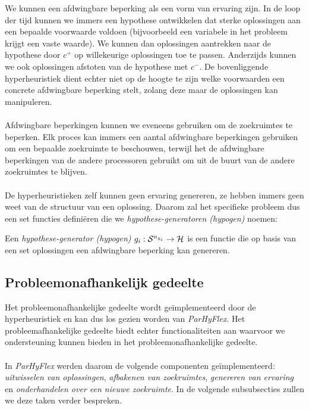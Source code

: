 We kunnen een afdwingbare beperking als een vorm van ervaring zijn. In de loop der tijd kunnen we immers een hypothese ontwikkelen dat sterke oplossingen aan een bepaalde voorwaarde voldoen (bijvoorbeeld een variabele in het probleem krijgt een vaste waarde). We kunnen dan oplossingen aantrekken naar de hypothese door $c^+$ op willekeurige oplossingen toe te passen. Anderzijds kunnen we ook oplossingen afstoten van de hypothese met $c^-$. De bovenliggende hyperheuristiek dient echter niet op de hoogte te zijn welke voorwaarden een concrete afdwingbare beperking stelt, zolang deze maar de oplossingen kan manipuleren.

\paragraph{}
Afdwingbare beperkingen kunnen we eveneens gebruiken om de zoekruimtes te beperken. Elk proces kan immers een aantal afdwingbare beperkingen gebruiken om een bepaalde zoekruimte te beschouwen, terwijl het de afdwingbare beperkingen van de andere processoren gebruikt om uit de buurt van de andere zoekruimtes te blijven.

\paragraph{}
De hyperheuristieken zelf kunnen geen ervaring genereren, ze hebben immers geen weet van de structuur van een oplossing. Daarom zal het specifieke probleem dus een set functies defini\"eren die we \emph{hypothese-generatoren (hypogen)} noemen:
\begin{definition}
Een \emph{hypothese-generator (hypogen)} $g_i:\mathcal{S}^{n_{g_i}}\rightarrow\mathcal{H}$ is een functie die op basis van een set oplossingen een afdwingbare beperking kan genereren.	
\end{definition}

\subsection{Probleemonafhankelijk gedeelte}

Het probleemonafhankelijke gedeelte wordt ge\"implementeerd door de hyperheuristiek en kan dus los gezien worden van \emph{ParHyFlex}. Het probleemafhankelijke gedeelte biedt echter functionaliteiten aan waarvoor we ondersteuning kunnen bieden in het probleemonafhankelijke gedeelte.

\paragraph{}
In \emph{ParHyFlex} werden daarom de volgende componenten ge\"implementeerd: \emph{uitwisselen van oplossingen}, \emph{afbakenen van zoekruimtes}, \emph{genereren van ervaring} en \emph{onderhandelen over een nieuwe zoekruimte}. In de volgende subsubsecties zullen we deze taken verder bespreken.

